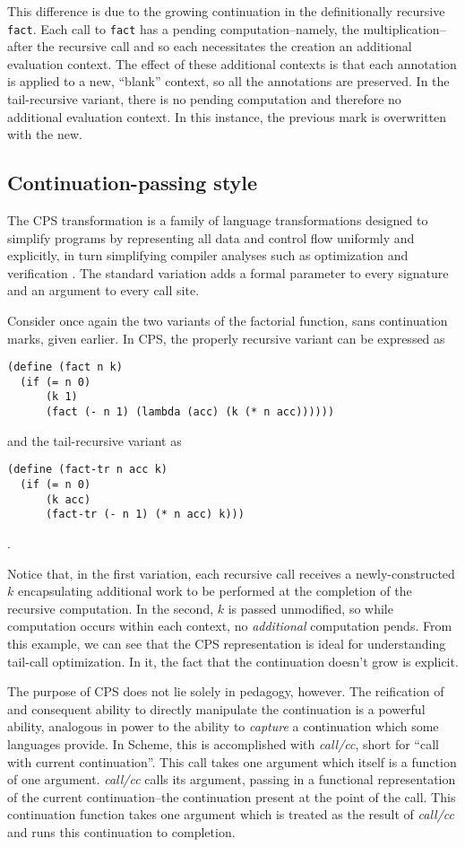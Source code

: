 \documentclass[ms]{byuprop}
\newcounter{definition}
\newcounter{example}
\begin{document}
This difference is due to the growing continuation in the definitionally recursive
\texttt{fact}. Each call to \texttt{fact} has a pending computation--namely, the
multiplication--after the recursive call and so each necessitates the creation an
additional evaluation context. The effect of these additional contexts is that each
annotation is applied to a new, ``blank'' context, so all the annotations are preserved. 
In the tail-recursive variant, there is no pending computation and therefore no additional
evaluation context. In this instance, the previous mark is overwritten with the new.

\subsection{Continuation-passing style}

The CPS transformation is a family of language transformations designed to simplify programs by representing all data and control flow uniformly and explicitly, in turn simplifying compiler analyses such as optimization and verification \cite{sabry1994formal}. The standard variation adds a formal parameter to every signature and an argument to every call site.

Consider once again the two variants of the factorial function, sans continuation marks, given earlier. In CPS, the properly recursive variant can be expressed as

\begin{verbatim}
(define (fact n k) 
  (if (= n 0)
      (k 1)
      (fact (- n 1) (lambda (acc) (k (* n acc))))))
\end{verbatim}

and the tail-recursive variant as

\begin{verbatim}
(define (fact-tr n acc k)
  (if (= n 0)
      (k acc)
      (fact-tr (- n 1) (* n acc) k)))
\end{verbatim}.

Notice that, in the first variation, each recursive call receives a newly-constructed 
$k$ encapsulating additional work to be performed at the completion of the recursive 
computation. In the second, $k$ is passed unmodified, so while computation occurs 
within each context, no \emph{additional} computation pends. From this example, we 
can see that the CPS representation is ideal for understanding tail-call optimization. 
In it, the fact that the continuation doesn't grow is explicit.

The purpose of CPS does not lie solely in pedagogy, however. The reification of and 
consequent ability to directly manipulate the continuation is a powerful ability, 
analogous in power to the ability to \emph{capture} a continuation which some 
languages provide. In Scheme, this is accomplished with \emph{call/cc}, short for 
``call with current continuation''. This call takes one argument which itself is a 
function of one argument. \emph{call/cc} calls its argument, passing in a functional 
representation of the current continuation--the continuation present at the point of 
the call. This continuation function takes one argument which is treated as the result 
of \emph{call/cc} and runs this continuation to completion.
\end{document}
